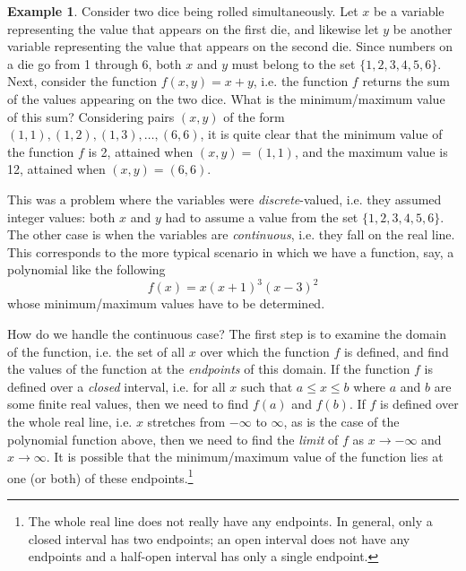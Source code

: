 \documentclass[a4paper]{article}
\theoremstyle{definition}
\newtheorem{example}{Example}[section]
\begin{document}
\begin{example}
	Consider two dice being rolled simultaneously.
	Let $x$ be a variable representing the value that appears on the first die, and likewise let $y$ be another variable representing the value that appears on the second die.
	Since numbers on a die go from 1 through 6, both $x$ and $y$ must belong to the set $\{1, 2, 3, 4, 5, 6\}$.
	Next, consider the function $f(x, y) = x + y$, i.e. the function $f$ returns the sum of the values appearing on the two dice.
	What is the minimum/maximum value of this sum?
	Considering pairs $(x, y)$ of the form $(1, 1), (1, 2), (1, 3), \dots, (6, 6)$, it is quite clear that the minimum value of the function $f$ is 2, attained when $(x, y) = (1, 1)$, and the maximum value is 12, attained when $(x, y) = (6, 6)$.
\end{example}

This was a problem where the variables were \textit{discrete}-valued, i.e. they assumed integer values: both $x$ and $y$ had to assume a value from the set $\{1, 2, 3, 4, 5, 6\}$.
The other case is when the variables are \textit{continuous}, i.e. they fall on the real line.
This corresponds to the more typical scenario in which we have a function, say, a polynomial like the following
\begin{equation*}
	f(x) = x (x + 1)^3 (x - 3)^2
\end{equation*}
whose minimum/maximum values have to be determined.

How do we handle the continuous case?
The first step is to examine the domain of the function, i.e. the set of all $x$ over which the function $f$ is defined, and find the values of the function at the \textit{endpoints} of this domain.
If the function $f$ is defined over a \textit{closed} interval, i.e. for all $x$ such that $a \leq x \leq b$ where $a$ and $b$ are some finite real values, then we need to find $f(a)$ and $f(b)$.
If $f$ is defined over the whole real line, i.e. $x$ stretches from $-\infty$ to $\infty$, as is the case of the polynomial function above, then we need to find the \textit{limit} of $f$ as $x \rightarrow -\infty$ and $x \rightarrow \infty$.
It is possible that the minimum/maximum value of the function lies at one (or both) of these endpoints.\footnote{
	The whole real line does not really have any endpoints.
	In general, only a closed interval has two endpoints; an open interval does not have any endpoints and a half-open interval has only a single endpoint.
}
\end{document}
